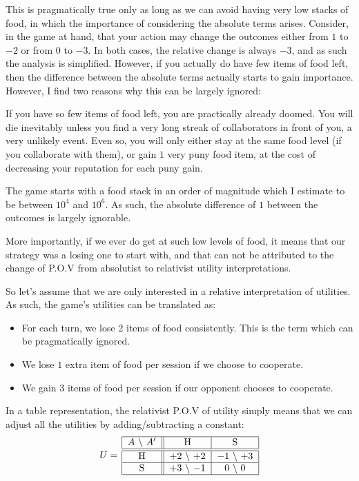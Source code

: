 \documentclass[10pt,fleqn]{article}
\begin{document}
This is pragmatically true only as long as we can avoid having very low stacks
of food, in which the importance of considering the absolute terms arises.
Consider, in the game at hand, that your action may change the outcomes either
from $1$ to $-2$ or from $0$ to $-3$. In both cases, the relative change is
always $-3$, and as such the analysis is simplified. However, if you actually do
have few items of food left, then the difference between the absolute terms
actually starts to gain importance. However, I find two reasons why this can be
largely ignored:
\begin{inlist}
  \item If you have so few items of food left, you are practically already
  doomed. You will die inevitably unless you find a very long streak of
  collaborators in front of you, a very unlikely event. Even so, you will only
  either stay at the same food level (if you collaborate with them), or gain $1$
  very puny food item, at the cost of decreasing your reputation for each puny
  gain.
  \item The game starts with a food stack in an order of magnitude which I
  estimate to be between $10^4$ and $10^6$. As such, the absolute difference of
  $1$ between the outcomes is largely ignorable.
  \item More importantly, if we ever do get at such low levels of food, it means
  that our strategy was a losing one to start with, and that can not be
  attributed to the change of P.O.V from absolutist to relativist utility
  interpretations.
\end{inlist}

So let's assume that we are only interested in a relative interpretation of
utilities. As such, the game's utilities can be translated as:
\begin{itemize}
  \item For each turn, we lose $2$ items of food consistently. This is the term
  which can be pragmatically ignored.
  \item We lose $1$ extra item of food per session if we choose to cooperate.
  \item We gain $3$ items of food per session if our opponent chooses to
  cooperate.
\end{itemize}

In a table representation, the relativist P.O.V of utility simply means that we
can adjust all the utilities by adding/subtracting a constant:
\begin{equation*}
  U =\, 
    \begin{tabular}{|c||c|c|}
      \hline
      $A$ \textbackslash\ $A'$ & H & S \\
      \hline\hline
      H & $+2$ \textbackslash\ $+2$ & $-1$ \textbackslash\ $+3$ \\
      \hline
      S & $+3$ \textbackslash\ $-1$ & $0$ \textbackslash\ $0$ \\
      \hline
    \end{tabular}
\end{equation*}
\end{document}
